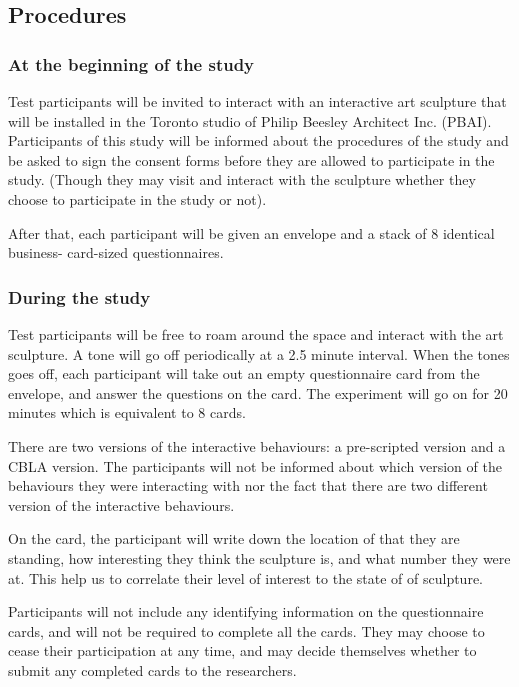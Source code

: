 \subsection{Procedures}

\subsubsection{At the beginning of the study}

Test participants will be invited to interact with an interactive art sculpture that will be
installed in the Toronto studio of Philip Beesley Architect Inc. (PBAI). Participants of this study will be informed about the procedures of the study and be asked to sign the consent forms before they are allowed to participate in the study. (Though they may visit and interact with the sculpture whether they choose to participate in the study or not).

After that, each participant will be given an envelope and a stack of 8 identical business-
card-sized questionnaires. 


\subsubsection{During the study}

Test participants will be free to roam around the space and interact with the art sculpture. A tone will go off periodically at a 2.5 minute interval. When the tones goes off, each participant will take out an empty questionnaire card from the envelope, and answer the questions on the card. The experiment will go on for 20 minutes which is equivalent to 8 cards. 

There are two versions of the interactive behaviours: a pre-scripted version and a CBLA
version. The participants will not be informed about which version of the behaviours they
were interacting with nor the fact that there are two different version of the interactive
behaviours. 

On the card, the participant will write down the location of that they are standing, how interesting they think the sculpture is, and what number they were at. This help us to correlate their level of interest to the state of of sculpture.

Participants will not include any identifying information on the questionnaire cards, and will not be required to complete all the cards. They may choose to cease their participation at any time, and may decide themselves whether to submit any completed cards to the researchers.

